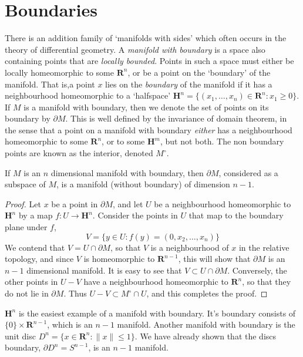 \section{Boundaries}

There is an addition family of `manifolds with sides' which often occurs in the theory of differential geometry. A \emph{manifold with boundary} is a space also containing points that are {\it locally bounded}. Points in such a space must either be locally homeomorphic to some $\mathbf{R}^n$, or be a point on the `boundary' of the manifold. That is,a point $x$ lies on the \emph{boundary} of the manifold if it has a neighbourhood homeomorphic to a `halfspace' $\mathbf{H}^n = \{ (x_1, \dots, x_n) \in \mathbf{R}^n: x_1 \geq 0 \}$. If $M$ is a manifold with boundary, then we denote the set of points on its boundary by $\partial M$. This is well defined by the invariance of domain theorem, in the sense that a point on a manifold with boundary {\it either} has a neighbourhood homeomorphic to some $\mathbf{R}^n$, or to some $\mathbf{H}^m$, but not both. The non boundary points are known as the interior, denoted $M^\circ$.

\begin{theorem}
    If $M$ is an $n$ dimensional manifold with boundary, then $\partial M$, considered as a subspace of $M$, is a manifold (without boundary) of dimension $n-1$.
\end{theorem}
\begin{proof}
    Let $x$ be a point in $\partial M$, and let $U$ be a neighbourhood homeomorphic to $\mathbf{H}^n$ by a map $f:U \to \mathbf{H}^n$. Consider the points in $U$ that map to the boundary plane under $f$,
    \[ V = \{ y \in U : f(y) = (0,x_2, \dots, x_n) \} \]
    We contend that $V = U \cap \partial M$, so that $V$ is a neighbourhood of $x$ in the relative topology, and since $V$ is homeomorphic to $\mathbf{R}^{n-1}$, this will show that $\partial M$ is an $n-1$ dimensional manifold. It is easy to see that $V \subset U \cap \partial M$. Conversely, the other points in $U - V$ have a neighbourhood homeomorphic to $\mathbf{R}^n$, so that they do not lie in $\partial M$. Thus $U - V \subset M^\circ \cap U$, and this completes the proof.
\end{proof}

\begin{example}
    $\mathbf{H}^n$ is the easiest example of a manifold with boundary. It's boundary consists of $\{ 0 \} \times \mathbf{R}^{n-1}$, which is an $n - 1$ manifold. Another manifold with boundary is the unit disc $D^n = \{ x \in \mathbf{R}^n : \|x\| \leq 1 \}$. We have already shown that the discs boundary, $\partial D^n = S^{n-1}$, is an $n - 1$ manifold.
\end{example}

